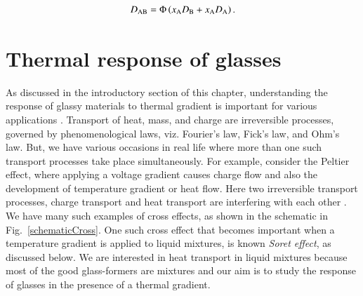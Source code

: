     \begin{equation}
    D_{\rm AB} = \Phi \left( x_{\rm A} D_{\rm B} + x_{\rm A} D_{\rm A} \right).
    \end{equation}

    

\section{Thermal response of glasses}
As discussed in the introductory section of this chapter, understanding the response of glassy materials to thermal gradient is important for various applications \cite{hufnagel2015cryogenic,schuh2007mechanical,koehler2016}. Transport of heat, mass, and charge are irreversible processes, governed by phenomenological laws, viz. Fourier's law, Fick's law, and Ohm's law. But, we have various occasions in real life where more than one such transport processes take place simultaneously. For example, consider the Peltier effect, where applying a voltage gradient causes charge flow and also the development of temperature gradient or heat flow. Here two irreversible transport processes, charge transport and heat transport are interfering with each other \cite{degroot}. We have many such examples of cross effects, as shown in the schematic in Fig.~\ref{schematicCross}. One such cross effect that becomes important when a temperature gradient is applied to liquid mixtures, is known {\em Soret effect}, as discussed below. We are interested in heat transport in liquid mixtures because most of the good glass-formers are mixtures and our aim is to study the response of glasses in the presence of a thermal gradient.
    
